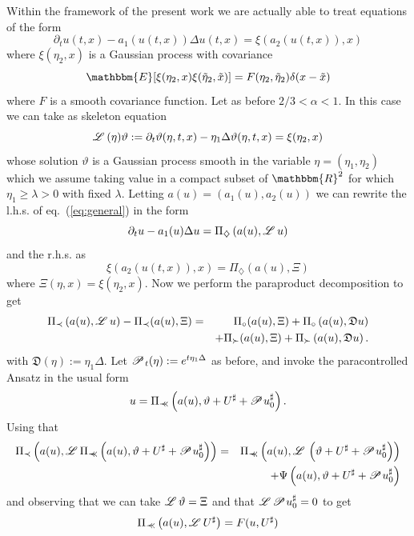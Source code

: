 \documentclass[11pt,reqno]{amsart}
\newcommand{\assign}{:=}
\newcommand{\precprec}{\prec\!\!\!\prec}
\newcommand{\LL}{\mathscr{L} \hspace{.2em}}
\newcommand{\PP}{\mathscr{P} \hspace{.1em}}
\newcommand{\DF}{\mathfrak{D}}
\begin{document}
Within the framework of the present work we are actually able to treat
equations of the form
\begin{equation}
  \partial_t u (t, x) - a_1 (u (t, x)) \Delta u (t, x) = \xi (a_2 (u (t, x)),
  x) \label{eq:general}
\end{equation}
where $\xi (\eta_2, x)$ is a Gaussian process with covariance
\[ \mathbbm{E} [\xi (\eta_2, x) \xi (\tilde{\eta}_2, \tilde{x})] = F (\eta_2, \tilde{\eta}_2)
   \delta (x - \tilde{x}) \]
where $F$ is a smooth covariance function. Let as before $2 / 3 < \alpha < 1$.
In this case we can take as skeleton equation
\[ \LL (\eta) \vartheta \assign \partial_t \vartheta (\eta, t, x) - \eta_1
   \Delta \vartheta (\eta, t, x) = \xi (\eta_2, x) \]
whose solution $\vartheta$ is a Gaussian process smooth in the variable $\eta
= (\eta_1, \eta_2)$ which we assume taking value in a compact subset of
$\mathbbm{R}^2$ for which $\eta_1 \geqslant \lambda > 0$ with fixed $\lambda$.
Letting $a (u) = (a_1 (u), a_2 (u))$ we can rewrite the l.h.s. of
eq.~(\ref{eq:general}) in the form
\[ \partial_t u - a_1 (u) \Delta u = \Pi_{\diamondsuit} \left( a (u), \LL u
   \right) \]
and the r.h.s. as
\[ \xi (a_2 (u (t, x)), x) = \Pi_{\diamondsuit} (a (u), \Xi) \]
where $\Xi (\eta, x) = \xi (\eta_2, x)$. Now we perform the paraproduct
decomposition to get
\begin{eqnarray*}
  \Pi_{\prec} \left( a (u), \LL u \right) - \Pi_{\prec} (a (u), \Xi) & = &
  \Pi_{\circ} (a (u), \Xi) + \Pi_{\circ} \left( a (u), \DF u \right)\\
  &  & + \Pi_{\succ} (a (u), \Xi) + \Pi_{\succ} \left( a (u), \DF u \right) .
\end{eqnarray*}
with $\DF (\eta) \assign \eta_1 \Delta$. Let $\PP_t (\eta) \assign e^{t \eta_1
\Delta}$ as before, and invoke the paracontrolled Ansatz in the usual form
\[ u = \Pi_{\precprec} \left( a (u), \vartheta + U^{\sharp} + \PP
   u^{\sharp}_0 \right) . \]
Using that
\begin{eqnarray*}
  \Pi_{\prec} \left( a (u), \LL \Pi_{\precprec} \left( a (u), \vartheta +
  U^{\sharp} + \PP u^{\sharp}_0 \right) \right) & = & \Pi_{\precprec} \left( a
  (u), \LL \left( \vartheta + U^{\sharp} + \PP u_0^{\sharp} \right) \right)\\
  &  & + \Psi \left( a (u), \vartheta + U^{\sharp} + \PP u^{\sharp}_0 \right)
\end{eqnarray*}
and observing that we can take $\LL \vartheta = \Xi$ and that $\LL \PP
u^{\sharp}_0 = 0$ to get
\[ \Pi_{\precprec} \left( a (u), \LL U^{\sharp} \right) = F (u, U^{\sharp}) \]
\end{document}
